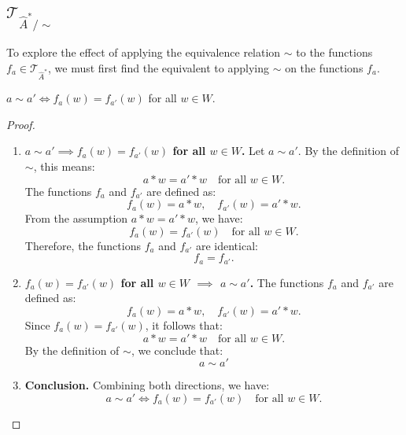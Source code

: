 \subsection{$\mathcal{T}_{\hat{A}^{\ast}/\sim}$}

To explore the effect of applying the equivalence relation $\sim$ to the functions $f_{a} \in \mathcal{T}_{\hat{A}^{\ast}}$, we must first find the equivalent to applying $\sim$ on the functions $f_{a}$.

\begin{proposition}\label{prp:equivalence_equivalence_on_functions}
	$a \sim a' \iff f_{a}(w) = f_{a'}(w)$ for all $w \in W$.
\end{proposition}
\begin{proof}
	\begin{enumerate}[(1)]
		\item \textbf{$a \sim a' \implies f_{a}(w) = f_{a'}(w)$ for all $w \in W$.}
		      Let $a \sim a'$. By the definition of $\sim$, this means:
		      \begin{equation}
			      a \ast w = a' \ast w \quad \text{for all } w \in W.
		      \end{equation}
		      The functions $f_{a}$ and $f_{a'}$ are defined as:
		      \begin{equation}
			      f_{a}(w) = a \ast w, \quad f_{a'}(w) = a' \ast w.
		      \end{equation}
		      From the assumption $a \ast w = a' \ast w$, we have:
		      \begin{equation}
			      f_{a}(w) = f_{a'}(w) \quad \text{for all } w \in W.
		      \end{equation}
		      Therefore, the functions $f_{a}$ and $f_{a'}$ are identical:
		      \begin{equation}
			      f_{a} = f_{a'}.
		      \end{equation}

		\item \textbf{$f_{a}(w) = f_{a'}(w)$ for all $w \in W$ $\implies$ $a \sim a'$.}
		      The functions $f_{a}$ and $f_{a'}$ are defined as:
		      \begin{equation}
			      f_{a}(w) = a \ast w, \quad f_{a'}(w) = a' \ast w.
		      \end{equation}
		      Since $f_{a}(w) = f_{a'}(w)$, it follows that:
		      \begin{equation}
			      a \ast w = a' \ast w \quad \text{for all } w \in W.
		      \end{equation}
		      By the definition of $\sim$, we conclude that:
		      \begin{equation}
			      a \sim a'
		      \end{equation}

		\item \textbf{Conclusion.}
		      Combining both directions, we have:
		      \begin{equation}
			      a \sim a' \iff f_{a}(w) = f_{a'}(w) \quad \text{for all } w \in W.
		      \end{equation}
	\end{enumerate}
\end{proof}

